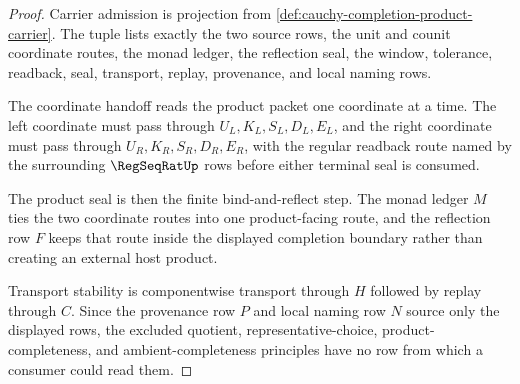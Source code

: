 \begin{proof}
Carrier admission is projection from \autoref{def:cauchy-completion-product-carrier}. The tuple lists exactly the two source rows, the unit and counit coordinate routes, the monad ledger, the reflection seal, the window, tolerance, readback, seal, transport, replay, provenance, and local naming rows.

The coordinate handoff reads the product packet one coordinate at a time. The left coordinate must pass through $U_L,K_L,S_L,D_L,E_L$, and the right coordinate must pass through $U_R,K_R,S_R,D_R,E_R$, with the regular readback route named by the surrounding $\RegSeqRatUp$ rows before either terminal seal is consumed.

The product seal is then the finite bind-and-reflect step. The monad ledger $M$ ties the two coordinate routes into one product-facing route, and the reflection row $F$ keeps that route inside the displayed completion boundary rather than creating an external host product.

Transport stability is componentwise transport through $H$ followed by replay through $C$. Since the provenance row $P$ and local naming row $N$ source only the displayed rows, the excluded quotient, representative-choice, product-completeness, and ambient-completeness principles have no row from which a consumer could read them.
\end{proof}

